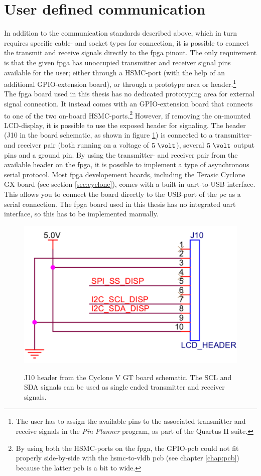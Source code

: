 \documentclass[main.tex]{subfiles}
\begin{document}
\section{User defined communication} \label{sec:usercom}

In addition to the communication standards described above, which in turn requires specific cable- and socket types for connection, it is possible to connect the transmit and receive signals directly to the \gls{fpga} pinout. The only requirement is that the given \gls{fpga} has unoccupied transmitter and receiver signal pins available for the user; either through a HSMC-port (with the help of an additional GPIO-extension board), or through a prototype area or header.\footnote{The user has to assign the available pins to the associated transmitter and receive signals in the \textit{Pin Planner} program, as part of the Quartus II suite.}\\

The \gls{fpga} board used in this thesis has no dedicated prototyping area for external signal connection. It instead comes with an GPIO-extension board that connects to one of the two on-board HSMC-ports.\footnote{By using both the HSMC-ports on the \gls{fpga}, the GPIO-\gls{pcb} could not fit properly side-by-side with the \acrshort{hsmc}-to-\acrshort{vldb} \acrshort{pcb} (see chapter \ref{chap:pcb}) because the latter \gls{pcb} is a bit to wide.} However, if removing the on-mounted LCD-display, it is possible to use the exposed header for signaling. The header (J10 in the board schematic, as shown in figure \ref{fig:lcdheader}) is connected to a transmitter- and receiver pair (both running on a voltage of $5~\volt$), several $5~\volt$ output pins and a ground pin. By using the transmitter- and receiver pair from the available header on the \gls{fpga}, it is possible to implement a type of asynchronous serial protocol. Most \gls{fpga} developement boards, including the Terasic Cyclone GX board (see section \ref{sec:cyclone}), comes with a built-in \gls{uart}-to-USB interface. This allows you to connect the board directly to the USB-port of the \acrshort{pc} as a serial connection. The \gls{fpga} board used in this thesis has no integrated \gls{uart} interface, so this has to be implemented manually.

\begin{figure}[] %
\includegraphics[width=0.5\linewidth]{../img/lcdheader.pdf}  \\[0.1 cm]
\caption{J10 header from the Cyclone V GT board schematic. The SCL and SDA signals can be used as single ended transmitter and receiver signals.}
\label{fig:lcdheader}
\end{figure}
\end{document}
